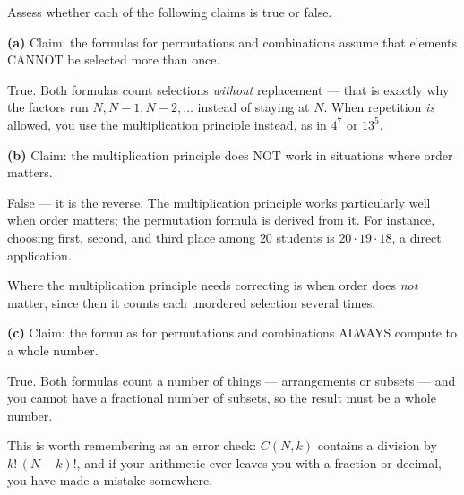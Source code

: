 \documentclass[12pt]{ximera}
\begin{document}
\begin{problem}
Assess whether each of the following claims is true or false.

\begin{prompt}
\textbf{(a)} Claim: the formulas for permutations and combinations assume that
elements CANNOT be selected more than once.

\begin{multipleChoice}
\end{multipleChoice}

\begin{solution}
True. Both formulas count selections \emph{without} replacement --- that is exactly
why the factors run $N, N-1, N-2,\ldots$ instead of staying at $N$. When repetition
\emph{is} allowed, you use the multiplication principle instead, as in $4^7$ or
$13^5$.
\end{solution}
\end{prompt}

\begin{prompt}
\textbf{(b)} Claim: the multiplication principle does NOT work in situations where
order matters.

\begin{multipleChoice}
\end{multipleChoice}

\begin{solution}
False --- it is the reverse. The multiplication principle works particularly well
when order matters; the permutation formula is derived from it. For instance,
choosing first, second, and third place among $20$ students is
$20\cdot 19\cdot 18$, a direct application.

Where the multiplication principle needs correcting is when order does \emph{not}
matter, since then it counts each unordered selection several times.
\end{solution}
\end{prompt}

\begin{prompt}
\textbf{(c)} Claim: the formulas for permutations and combinations ALWAYS compute to
a whole number.

\begin{multipleChoice}
\end{multipleChoice}

\begin{solution}
True. Both formulas count a number of things --- arrangements or subsets --- and you
cannot have a fractional number of subsets, so the result must be a whole number.

This is worth remembering as an error check: $C(N,k)$ contains a division by
$k!\,(N-k)!$, and if your arithmetic ever leaves you with a fraction or decimal, you
have made a mistake somewhere.
\end{solution}
\end{prompt}
\end{problem}
\end{document}
